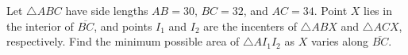 Let \(\triangle ABC\) have side lengths \(AB=30\), \(BC=32\), and \(AC=34\). Point \(X\) lies in the interior of \(\overline{BC}\), and points \(I_1\) and \(I_2\) are the incenters of \(\triangle ABX\) and \(\triangle ACX\), respectively. Find the minimum possible area of \(\triangle AI_1I_2\) as \( X\) varies along \(\overline{BC}\).